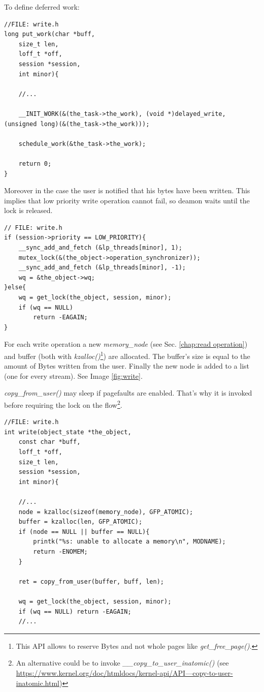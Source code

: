 \documentclass[12pt]{report}
\begin{document}
To define deferred work:

\begin{lstlisting}
//FILE: write.h
long put_work(char *buff,
	size_t len,
	loff_t *off,
	session *session,
	int minor){
	
	//...
	
	__INIT_WORK(&(the_task->the_work), (void *)delayed_write, (unsigned long)(&(the_task->the_work)));
	
	schedule_work(&the_task->the_work);
	
	return 0;
}
\end{lstlisting}

Moreover in the case the user is notified that his bytes have been written. This implies that low priority write operation cannot fail, so deamon waits until the lock is released.

\begin{lstlisting}
// FILE: write.h 
if (session->priority == LOW_PRIORITY){
	__sync_add_and_fetch (&lp_threads[minor], 1);
	mutex_lock(&(the_object->operation_synchronizer));
	__sync_add_and_fetch (&lp_threads[minor], -1);
	wq = &the_object->wq;
}else{
	wq = get_lock(the_object, session, minor);
	if (wq == NULL)
		return -EAGAIN;
}
\end{lstlisting}

For each write operation a new \emph{memory\_node} (see Sec. \ref{chap:read operation}) and buffer (both with \emph{kzalloc()}\footnote{This API allows to reserve Bytes and not whole pages like \emph{get\_free\_page()}.}) are allocated. The buffer's size is equal to the amount of Bytes written from the user. Finally the new node is added to a list (one for every stream). See Image \ref{fig:write}.

\emph{copy\_from\_user()} may sleep if pagefaults are enabled. That's why it is invoked before requiring the lock on the flow\footnote{An alternative could be to invoke \emph{\_\_copy\_to\_user\_inatomic()} (see \href{https://www.kernel.org/doc/htmldocs/kernel-api/API---copy-to-user-inatomic.html}{https://www.kernel.org/doc/htmldocs/kernel-api/API---copy-to-user-inatomic.html})}.

\begin{lstlisting}
//FILE: write.h
int write(object_state *the_object,
	const char *buff,
	loff_t *off, 
	size_t len, 
	session *session,
	int minor){

	//...
	node = kzalloc(sizeof(memory_node), GFP_ATOMIC);
	buffer = kzalloc(len, GFP_ATOMIC);
	if (node == NULL || buffer == NULL){
		printk("%s: unable to allocate a memory\n", MODNAME);
		return -ENOMEM;
	}
	
	ret = copy_from_user(buffer, buff, len);
	
	wq = get_lock(the_object, session, minor);
	if (wq == NULL) return -EAGAIN;
	//...
\end{lstlisting}
\end{document}
